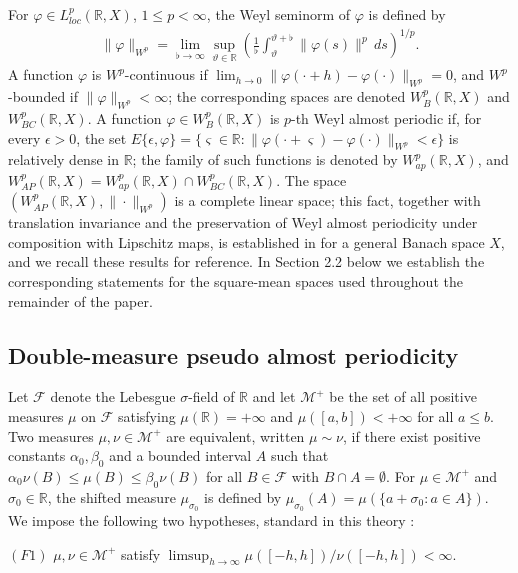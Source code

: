 \documentclass[10pt,a4paper]{amsart}
\begin{document}
For $\varphi\in L^p_{loc}(\mathbb R,X)$, $1\le p<\infty$, the Weyl seminorm of $\varphi$ is defined by
\begin{align*}
\|\varphi\|_{W^p}=\lim_{\flat\to\infty}\sup_{\vartheta\in\mathbb R}\left(\frac1\flat\int_{\vartheta}^{\vartheta+\flat}\|\varphi(s)\|^p\,ds\right)^{1/p}.
\end{align*}
A function $\varphi$ is $W^p$-continuous if $\lim_{h\to0}\|\varphi(\cdot+h)-\varphi(\cdot)\|_{W^p}=0$, and $W^p$-bounded if $\|\varphi\|_{W^p}<\infty$; the corresponding spaces are denoted $W^p_{B}(\mathbb R,X)$ and $W^p_{BC}(\mathbb R,X)$. A function $\varphi\in W^p_{B}(\mathbb R,X)$ is $p$-th Weyl almost periodic if, for every $\epsilon>0$, the set $E\{\epsilon,\varphi\}=\{\varsigma\in\mathbb R:\|\varphi(\cdot+\varsigma)-\varphi(\cdot)\|_{W^p}<\epsilon\}$ is relatively dense in $\mathbb R$; the family of such functions is denoted by $W^p_{ap}(\mathbb R,X)$, and $W^p_{AP}(\mathbb R,X)=W^p_{ap}(\mathbb R,X)\cap W^p_{BC}(\mathbb R,X)$. The space $(W^p_{AP}(\mathbb R,X),\|\cdot\|_{W^p})$ is a complete linear space; this fact, together with translation invariance and the preservation of Weyl almost periodicity under composition with Lipschitz maps, is established in \cite[Section 2]{LiWeyl} for a general Banach space $X$, and we recall these results for reference. In Section 2.2 below we establish the corresponding statements for the square-mean spaces used throughout the remainder of the paper.

\subsection{Double-measure pseudo almost periodicity}

Let $\mathcal F$ denote the Lebesgue $\sigma$-field of $\mathbb R$ and let $\mathcal M^+$ be the set of all positive measures $\mu$ on $\mathcal F$ satisfying $\mu(\mathbb R)=+\infty$ and $\mu([a,b])<+\infty$ for all $a\le b$. Two measures $\mu,\nu\in\mathcal M^+$ are equivalent, written $\mu\sim\nu$, if there exist positive constants $\alpha_0,\beta_0$ and a bounded interval $A$ such that $\alpha_0\nu(B)\le\mu(B)\le\beta_0\nu(B)$ for all $B\in\mathcal F$ with $B\cap A=\emptyset$. For $\mu\in\mathcal M^+$ and $\sigma_0\in\mathbb R$, the shifted measure $\mu_{\sigma_0}$ is defined by $\mu_{\sigma_0}(A)=\mu(\{a+\sigma_0:a\in A\})$. We impose the following two hypotheses, standard in this theory \cite{BlotCieutatEzzinbi,DiaganaEzzinbiMiraoui}:

$(F1)$ $\mu,\nu\in\mathcal M^+$ satisfy $\limsup_{h\to\infty}\mu([-h,h])/\nu([-h,h])<\infty$.
\end{document}

